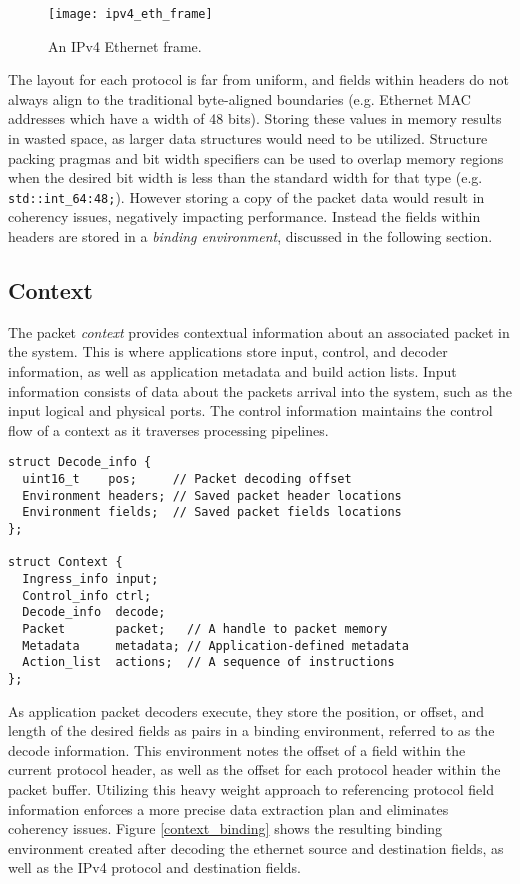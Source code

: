 \begin{figure}[h]
\centering
\texttt{[image: ipv4\_eth\_frame]}
\caption{An IPv4 Ethernet frame.}
\label{ipv4_eth_frame}
\end{figure}

The layout for each protocol is far from uniform, and fields within headers do
not always align to the traditional byte-aligned boundaries (e.g. Ethernet
MAC addresses which have a width of 48 bits). Storing these values in memory
results in wasted space, as larger data structures would need to be utilized.
Structure packing pragmas and bit width specifiers can be used to overlap
memory regions when the desired bit width is less than the standard width for
that type (e.g. \texttt{std::int\_64:48;}). However storing a copy of the
packet data would result in coherency issues, negatively impacting
performance. Instead the fields within headers are stored in a \emph{binding
environment}, discussed in the following section.

\subsection{Context}
The packet \emph{context} provides contextual information about an associated
packet in the system. This is where applications store input, control, and
decoder information, as well as application metadata and build action lists.
Input information consists of data about the packets arrival into the system,
such as the input logical and physical ports. The control information maintains
the control flow of a context as it traverses processing pipelines.

\begin{lstlisting}
struct Decode_info {
  uint16_t    pos;     // Packet decoding offset
  Environment headers; // Saved packet header locations
  Environment fields;  // Saved packet fields locations
};

struct Context {
  Ingress_info input;
  Control_info ctrl;
  Decode_info  decode;
  Packet       packet;   // A handle to packet memory
  Metadata     metadata; // Application-defined metadata
  Action_list  actions;  // A sequence of instructions
};
\end{lstlisting}

As application packet decoders execute, they store the position, or offset, and
length of the desired fields as pairs in a binding environment, referred to as
the decode information. This environment notes the offset of a field within the
current protocol header, as well as the offset for each protocol header within
the packet buffer. Utilizing this heavy weight approach to referencing protocol
field information enforces a more precise data extraction plan and eliminates
coherency issues. Figure \ref{context_binding} shows the resulting binding
environment created after decoding the ethernet source and destination fields,
as well as the IPv4 protocol and destination fields.

